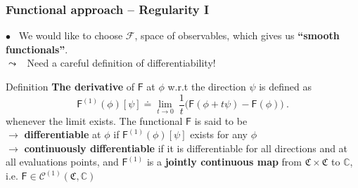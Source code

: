 \documentclass[9pt]{beamer}
\newcommand{\Ccal}{\mathcal{C}}
\newcommand{\Fcal}{\mathcal{F}}
\newcommand{\Cbb}{\mathbb{C}}
\newcommand{\Crak}{\mathfrak{C}}
\newcommand{\Fsf}{\mathsf{F}}
\begin{document}
\begin{frame}

\frametitle{Functional approach -- Regularity I}

\vfill

$\bullet$ \ We would like to choose $\Fcal$, space of observables, which gives us \textbf{``smooth functionals''}. \\
\qquad $\leadsto$ \ Need a careful definition of differentiability!

\vfill

\begin{block}{Definition}
\textbf{The derivative} of $\Fsf$ at $\phi$ w.r.t the direction $\psi$ is defined as 
\begin{equation*}%
\Fsf^{(1)}(\phi)[\psi] \doteq \lim_{t \to 0} \ \frac{1}{t} \bigg( \Fsf(\phi + t \psi) - \Fsf(\phi) \bigg) \ .
\end{equation*}
whenever the limit exists. The functional $\Fsf$ is said to be  \\
\quad $\to$ \textbf{differentiable} at $\phi$ if $\Fsf^{(1)}(\phi)[\psi]$ exists for any $\phi$ \\
\quad $\to$ \textbf{continuously differentiable} if it is differentiable for all directions and at all evaluations points, and $\Fsf^{(1)}$ is a \textbf{jointly continuous map} from $\Crak \times \Crak$ to $\Cbb$, i.e. $\Fsf \in \Ccal^{(1)}(\Crak,\Cbb)$
\end{block}

\vfill

\end{frame}

\end{document}
